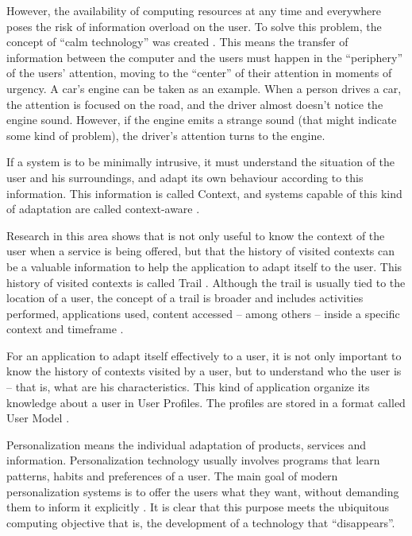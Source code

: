 \documentclass{svjour3}                     %
\begin{document}
However, the availability of computing resources at any time and everywhere
poses the risk of information overload on the user. To solve this problem, the
concept of ``calm technology'' was created \citep{weiser96}. This means the
transfer of information between the computer and the users must happen in the
``periphery'' of the users' attention, moving to the ``center'' of their
attention in moments of urgency. A car's engine can be taken as an example. When
a person drives a car, the attention is focused on the road, and the driver almost doesn't notice the engine sound. However, if the engine emits a strange sound (that might indicate some kind of problem), the driver's attention turns to the engine.

If a system is to be minimally intrusive, it must understand the situation of
the user and his surroundings, and adapt its own behaviour according to this
information. This information is called Context, and systems capable of this
kind of adaptation are called context-aware \citep{satyanarayanan01,dey2001}. 

Research in this area shows that is not only useful to know the context of the
user when a service is being offered, but that the history of visited contexts
can be a valuable information to help the application to adapt itself to the
user. This history of visited contexts is called Trail \citep{driver08}. Although
the trail is usually tied to the location of a user, the concept of a trail is
broader and includes activities performed, applications used, content accessed
-- among others -- inside a specific context and timeframe \citep{silva10}.


For an application to adapt itself effectively to a user, it is not only important to know the history of contexts visited by a user, but to understand who the user is -- that is, what are his characteristics. This kind of application organize its knowledge about a user in User Profiles. The profiles are stored in a format called User Model \citep{viviani10,todo}.


Personalization means the individual adaptation of products, services and information. Personalization technology usually involves programs that learn patterns, habits and preferences of a user. The main goal of modern personalization systems is to offer the users what they want, without demanding them to inform it explicitly \citep{mulvenna00}. It is clear that this purpose meets the ubiquitous computing objective that is, the development of a technology that ``disappears''.
\end{document}
